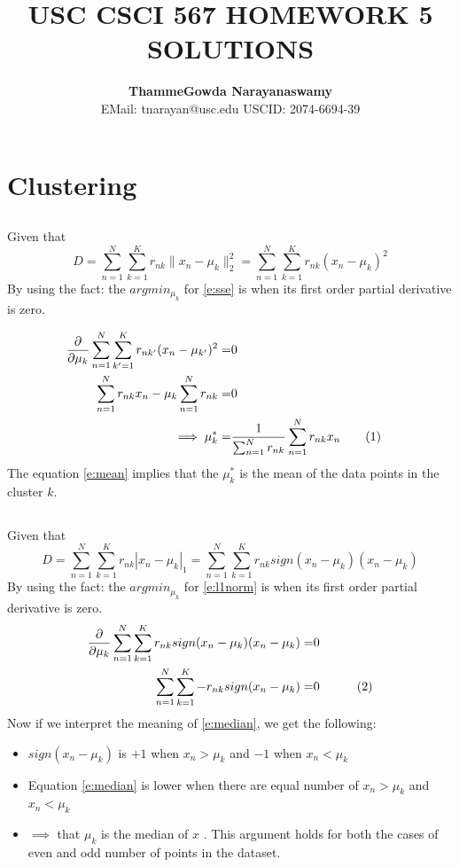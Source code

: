\documentclass[a4paper,doc,notimes]{article}
\title{\noindent  \textbf{ USC CSCI 567 HOMEWORK 5 SOLUTIONS} }
\author{\textbf{ThammeGowda Narayanaswamy} \\
EMail: tnarayan@usc.edu  USCID: 2074-6694-39}
\date{} %
\newcommand\numberthis{\addtocounter{equation}{1}\tag{\theequation}}
\begin{document}
\maketitle


\section{Clustering}
\subsection{}
Given that 
\begin{equation}\label{e:sse}
	D = \sum_{n=1}^{N} \sum_{k=1}^{K} r_{nk} \parallel x_n - \mu_k \parallel^2_2 = \sum_{n=1}^{N} \sum_{k=1}^{K} r_{nk} (x_n - \mu_k)^2
\end{equation}
By using the fact: the $argmin_{\mu_k}$ for \ref{e:sse} is when its first order partial derivative is zero.

\begin{align*}
  \frac{\partial}{\partial \mu_k} \sum_{n=1}^{N} \sum_{k'=1}^{K} r_{nk'} (x_n - \mu_{k'})^2 =& 0 & \\
   \sum_{n=1}^{N} r_{nk} x_n - \mu_k \sum_{n=1}^{N} r_{nk}  =& 0 & \\ 
   \implies \mu_k^* =& \frac{1}{\sum_{n=1}^{N} r_{nk}} \sum_{n=1}^{N} r_{nk} x_n \numberthis \label{e:mean}
\end{align*}
The equation \ref{e:mean} implies that the $\mu_k^*$ is the mean of the data points in the cluster $k$.

\subsection{}
Given that 
\begin{equation}\label{e:l1norm}
	D = \sum_{n=1}^{N} \sum_{k=1}^{K} r_{nk} | x_n - \mu_k |_1 = \sum_{n=1}^{N} \sum_{k=1}^{K} r_{nk} sign(x_n - \mu_k) (x_n - \mu_k)
\end{equation}
By using the fact: the $argmin_{\mu_k}$ for \ref{e:l1norm} is when its first order partial derivative is zero.
\begin{align*}
 \frac{\partial}{\partial \mu_k}\sum_{n=1}^{N} \sum_{k=1}^{K} r_{nk} sign(x_n - \mu_k) (x_n - \mu_k) =& 0 & \\
 \sum_{n=1}^{N} \sum_{k=1}^{K} - r_{nk} sign(x_n - \mu_k) =& 0 & \numberthis \label{e:median}
\end{align*}
Now if we interpret the meaning of \ref{e:median}, we get the following:
\begin{itemize}
	
	\item $sign(x_n - \mu_k)$ is $+1$ when $x_n > \mu_k$ and $-1$ when $x_n < \mu_k$
	\item Equation \ref{e:median} is lower when there are equal number of $x_n > \mu_k$ and $x_n < \mu_k$
	\item $\implies$ that $\mu_k$ is the median of $x$ . This argument holds for both the cases of even and odd number of points in the dataset.
\end{itemize}
\end{document}
